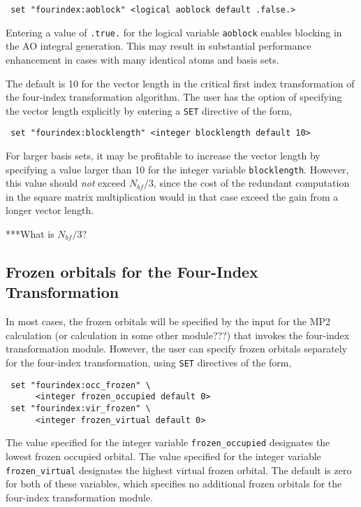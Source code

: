 \begin{verbatim}
 set "fourindex:aoblock" <logical aoblock default .false.>
\end{verbatim}

Entering a value of \verb+.true.+ for the logical variable \verb+aoblock+ 
enables blocking in the AO integral generation. This may result in 
substantial performance enhancement in cases with many identical 
atoms and basis sets.

The default is 10 for the vector length in the critical first index 
transformation of the four-index transformation algorithm.  The user has
the option of specifying the vector length explicitly by entering a 
\verb+SET+ directive of the form,

\begin{verbatim}
 set "fourindex:blocklength" <integer blocklength default 10>
\end{verbatim}


For larger basis sets, it may be profitable to increase the vector
length by specifying a value larger than 10 for the integer variable
\verb+blocklength+.  However, this value should {\em
  not} exceed $N_{bf} / 3$, since the cost of the redundant computation 
in the square matrix multiplication would in that case exceed the 
gain from a longer vector length.

\Large
***What is $N_{bf} / 3$?
\normalsize

\subsection{Frozen orbitals for the Four-Index Transformation}

In most cases, the frozen orbitals will be specified by the input for the 
MP2 calculation (or calculation in some other module???) that invokes the
four-index transformation module.  However, the user can specify frozen
orbitals separately for the four-index transformation, using \verb+SET+
directives of the form,

\begin{verbatim}
 set "fourindex:occ_frozen" \
      <integer frozen_occupied default 0>
 set "fourindex:vir_frozen" \
      <integer frozen_virtual default 0>
\end{verbatim}

The value specified for the integer variable \verb+frozen_occupied+ 
designates the lowest frozen occupied orbital.  The value specified
for the integer variable \verb+frozen_virtual+ designates the highest
virtual frozen orbital.  The default is zero for both of these variables,
which specifies no additional frozen orbitals for the four-index
transformation module.

